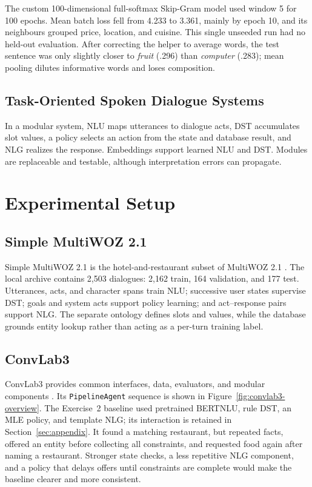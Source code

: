 \documentclass[11pt]{article}
\begin{document}
The custom 100-dimensional full-softmax Skip-Gram model used window 5 for 100
epochs. Mean batch loss fell from 4.233 to 3.361, mainly by epoch 10, and its
neighbours grouped price, location, and cuisine. This single unseeded run had
no held-out evaluation. After correcting the helper to average words, the test
sentence was only slightly closer to \textit{fruit} (.296) than
\textit{computer} (.283); mean pooling dilutes informative words and loses
composition.

\subsection{Task-Oriented Spoken Dialogue Systems}
In a modular system, NLU maps utterances to dialogue acts, DST accumulates slot
values, a policy selects an action from the state and database result, and NLG
realizes the response. Embeddings support learned NLU and DST. Modules are
replaceable and testable, although interpretation errors can propagate.

\section{Experimental Setup}\label{sec:setup}

\subsection{Simple MultiWOZ 2.1}
Simple MultiWOZ 2.1 is the hotel-and-restaurant subset of MultiWOZ 2.1
\citep{eric-etal-2020-multiwoz}. The local archive contains 2,503 dialogues:
2,162 train, 164 validation, and 177 test. Utterances, acts, and character spans
train NLU; successive user states supervise DST; goals and system acts support
policy learning; and act--response pairs support NLG. The separate ontology
defines slots and values, while the database grounds entity lookup rather than
acting as a per-turn training label.

\subsection{ConvLab3}
ConvLab3 provides common interfaces, data, evaluators, and modular components
\citep{zhu-etal-2023-convlab}. Its \texttt{PipelineAgent} sequence is shown in
Figure~\ref{fig:convlab3-overview}. The Exercise~2 baseline used pretrained
BERTNLU, rule DST, an MLE policy, and template NLG; its interaction is retained
in Section~\ref{sec:appendix}. It found a matching restaurant, but repeated
facts, offered an entity before collecting all constraints, and requested food
again after naming a restaurant. Stronger state checks, a less repetitive NLG
component, and a policy that delays offers until constraints are complete would
make the baseline clearer and more consistent.
\end{document}
